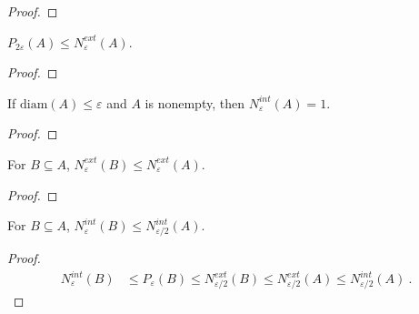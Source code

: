 \begin{proof}
\end{proof}


\begin{lemma}\label{lem:packingNumber_two_le_externalCoveringNumber}
  \mathlibok
$P_{2\varepsilon}(A) \le N^{ext}_\varepsilon(A)$.
\end{lemma}

\begin{proof}
\end{proof}


\begin{lemma}\label{lem:internalCoveringNumber_eq_one_of_diam_le}
  \mathlibok
If $\mathrm{diam}(A) \le \varepsilon$ and $A$ is nonempty, then $N^{int}_\varepsilon(A) = 1$.
\end{lemma}

\begin{proof}
\end{proof}


\begin{lemma}\label{lem:externalCoveringNumber_mono}
  \mathlibok
For $B \subseteq A$, $N^{ext}_\varepsilon(B) \le N^{ext}_{\varepsilon}(A)$.
\end{lemma}

\begin{proof}
\end{proof}


\begin{lemma}\label{lem:internalCoveringNumber_subset_le}
  \mathlibok
For $B \subseteq A$, $N^{int}_\varepsilon(B) \le N^{int}_{\varepsilon/2}(A)$.
\end{lemma}

\begin{proof}  
\begin{align*}
  N^{int}_\varepsilon(B)
  &\le P_{\varepsilon}(B)
  \le N^{ext}_{\varepsilon/2}(B)
  \le N^{ext}_{\varepsilon/2}(A)
  \le N^{int}_{\varepsilon/2}(A)
  \: .
\end{align*}
\end{proof}


